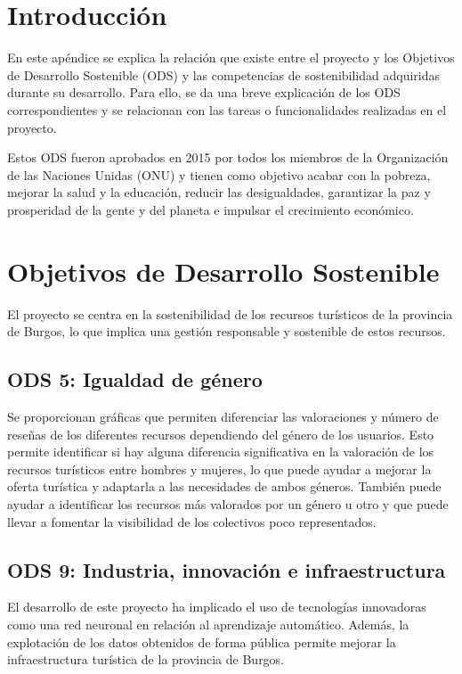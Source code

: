 
\section{Introducción}

En este apéndice se explica la relación que existe entre el proyecto y los Objetivos de Desarrollo Sostenible (ODS) y las competencias de sostenibilidad adquiridas durante su desarrollo.
Para ello, se da una breve explicación de los ODS correspondientes y se relacionan con las tareas o funcionalidades realizadas en el proyecto.

Estos ODS fueron aprobados en 2015 por todos los miembros de la Organización de las Naciones Unidas (ONU) y tienen como objetivo 
acabar con la pobreza, mejorar la salud y la educación, reducir las desigualdades, garantizar la paz y prosperidad de la gente y del planeta e impulsar el crecimiento económico.\cite{ods}

\section{Objetivos de Desarrollo Sostenible}

El proyecto se centra en la sostenibilidad de los recursos turísticos de la provincia de Burgos, lo que implica una gestión responsable y sostenible de estos recursos.

\subsection{ODS 5: Igualdad de género}

Se proporcionan gráficas que permiten diferenciar las valoraciones y número de reseñas de los diferentes recursos dependiendo del género de los usuarios.
Esto permite identificar si hay alguna diferencia significativa en la valoración de los recursos turísticos entre hombres y mujeres, lo que puede ayudar a mejorar la oferta turística y adaptarla a las necesidades de ambos géneros.
También puede ayudar a identificar los recursos más valorados por un género u otro y que puede llevar a fomentar la visibilidad de los colectivos poco representados.

\subsection{ODS 9: Industria, innovación e infraestructura}

El desarrollo de este proyecto ha implicado el uso de tecnologías innovadoras como una red neuronal en relación al aprendizaje automático.
Además, la explotación de los datos obtenidos de forma pública permite mejorar la infraestructura turística de la provincia de Burgos.


